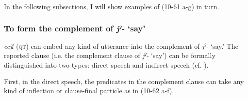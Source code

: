 In the following subsections, I will show examples of (10-61 a-g) in turn.

\subsubsection{To form the complement of \textit{jˀ-} ‘say’}\label{sec:10.4.1.1}

\textit{ccjɨ} (\textsc{qt}) can embed any kind of utterance into the complement of \textit{jˀ-} ‘say.’ The reported clause (i.e. the complement clause of \textit{jˀ-} ‘say’) can be formally distinguished into two types: direct speech and indirect speech (cf. \citealt{Aikhenvald2004}).

First, in the direct speech, the predicates in the complement clause can take any kind of inflection or clause-final particle as in (10-62 a-f).

